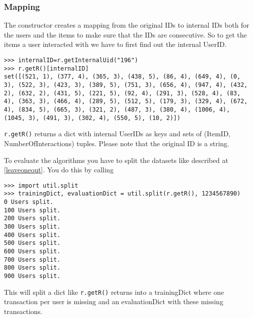 \subsubsection*{Mapping}
The constructor creates a mapping from the original IDs to internal IDs both for the users
and the items to make sure that the IDs are consecutive. So to get the items a user interacted
with we have to first find out the internal UserID.
\begin{lstlisting}[style=python]
>>> internalID=r.getInternalUid("196")
>>> r.getR()[internalID]
set([(521, 1), (377, 4), (365, 3), (438, 5), (86, 4), (649, 4), (0, 3), (522, 3), (423, 3), (389, 5), (751, 3), (656, 4), (947, 4), (432, 2), (632, 2), (431, 5), (221, 5), (92, 4), (291, 3), (528, 4), (83, 4), (363, 3), (466, 4), (289, 5), (512, 5), (179, 3), (329, 4), (672, 4), (834, 5), (665, 3), (321, 2), (487, 3), (380, 4), (1006, 4), (1045, 3), (491, 3), (302, 4), (550, 5), (10, 2)])
\end{lstlisting}
\lstinline!r.getR()! returns a dict with internal UserIDs as keys and sets of (ItemID, NumberOfInteractions) tuples.
Please note that the original ID is a string.

To evaluate the algorithms you have to split the datasets like described at \ref{leaveoneout}.
You do this by calling
\begin{lstlisting}[style=python]
>>> import util.split
>>> trainingDict, evaluationDict = util.split(r.getR(), 1234567890)
0 Users split.
100 Users split.
200 Users split.
300 Users split.
400 Users split.
500 Users split.
600 Users split.
700 Users split.
800 Users split.
900 Users split.
\end{lstlisting}
This will split a dict like \lstinline!r.getR()! returns into a trainingDict where one transaction
per user is missing and an evaluationDict with these missing transactions.


